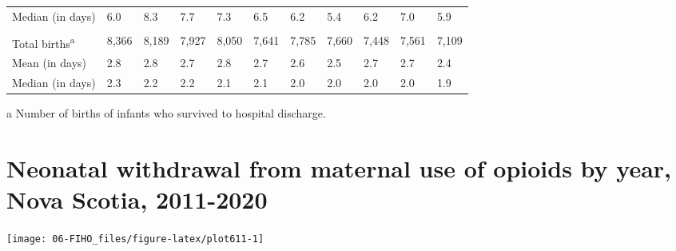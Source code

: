 \documentclass[
]{krantz}
\begin{document}
\begin{table}[H]
{\begin{threeparttable}
\begin{tabular}[t]{lllllllllll}
Median (in days) & 6.0 & 8.3 & 7.7 & 7.3 & 6.5 & 6.2 & 5.4 & 6.2 & 7.0 & 5.9\\
\cellcolor[HTML]{E1E1E1}{\textbf{weight $\geq$ 2500 g}} & \cellcolor[HTML]{E1E1E1}{\textbf{}} & \cellcolor[HTML]{E1E1E1}{\textbf{}} & \cellcolor[HTML]{E1E1E1}{\textbf{}} & \cellcolor[HTML]{E1E1E1}{\textbf{}} & \cellcolor[HTML]{E1E1E1}{\textbf{}} & \cellcolor[HTML]{E1E1E1}{\textbf{}} & \cellcolor[HTML]{E1E1E1}{\textbf{}} & \cellcolor[HTML]{E1E1E1}{\textbf{}} & \cellcolor[HTML]{E1E1E1}{\textbf{}} & \cellcolor[HTML]{E1E1E1}{\textbf{}}\\
Total births\textsuperscript{a} & 8,366 & 8,189 & 7,927 & 8,050 & 7,641 & 7,785 & 7,660 & 7,448 & 7,561 & 7,109\\
Mean (in days) & 2.8 & 2.8 & 2.7 & 2.8 & 2.7 & 2.6 & 2.5 & 2.7 & 2.7 & 2.4\\
Median (in days) & 2.3 & 2.2 & 2.2 & 2.1 & 2.1 & 2.0 & 2.0 & 2.0 & 2.0 & 1.9\\
\bottomrule
\end{tabular}
\begin{tablenotes}
\item[a] Number of births of infants who survived to hospital discharge.
\end{tablenotes}
\end{threeparttable}}
\end{table}

\hypertarget{section-611}{%
\section{Neonatal withdrawal from maternal use of opioids by year, Nova Scotia, 2011-2020}\label{section-611}}

\begin{center}\texttt{[image: 06-FIHO\_files/figure-latex/plot611-1]} \end{center}
\end{document}

